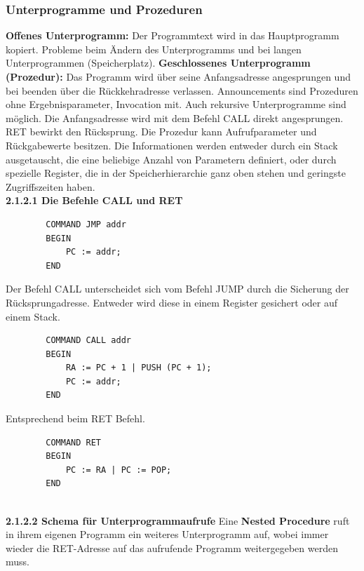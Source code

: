 \documentclass{article}
\begin{document}
\subsubsection{Unterprogramme und Prozeduren}
    \textbf{Offenes Unterprogramm:}\newline
    Der Programmtext wird in das Hauptprogramm kopiert. Probleme beim Ändern des Unterprogramms und bei langen Unterprogrammen (Speicherplatz).\newline
    \textbf{Geschlossenes Unterprogramm (Prozedur):}\newline
    Das Programm wird über seine Anfangsadresse angesprungen und bei beenden über die Rückkehradresse verlassen. Announcements sind Prozeduren ohne Ergebnisparameter, Invocation mit. Auch rekursive Unterprogramme sind möglich.\newline
    Die Anfangsadresse wird mit dem Befehl CALL direkt angesprungen. RET bewirkt den Rücksprung. Die Prozedur kann Aufrufparameter und Rückgabewerte besitzen.\newline
    Die Informationen werden entweder durch ein Stack ausgetauscht, die eine beliebige Anzahl von Parametern definiert, oder durch spezielle Register, die in der Speicherhierarchie ganz oben stehen und geringste Zugriffszeiten haben.\newline
    \\
    \textbf{2.1.2.1 Die Befehle CALL und RET}\newline
    \begin{lstlisting}
        COMMAND JMP addr
        BEGIN 
            PC := addr;
        END
    \end{lstlisting}
    Der Befehl CALL unterscheidet sich vom Befehl JUMP durch die Sicherung der Rücksprungadresse. Entweder wird diese in einem Register gesichert oder auf einem Stack.
    \begin{lstlisting}
        COMMAND CALL addr
        BEGIN 
            RA := PC + 1 | PUSH (PC + 1);
            PC := addr;
        END
    \end{lstlisting}
    Entsprechend beim RET Befehl.
    \begin{lstlisting}
        COMMAND RET
        BEGIN 
            PC := RA | PC := POP;
        END
    \end{lstlisting}
    \\
    \textbf{2.1.2.2 Schema für Unterprogrammaufrufe}\newline
    Eine \textbf{Nested Procedure} ruft in ihrem eigenen Programm ein weiteres Unterprogramm auf, wobei immer wieder die RET-Adresse auf das aufrufende Programm weitergegeben werden muss.  
\end{document}
